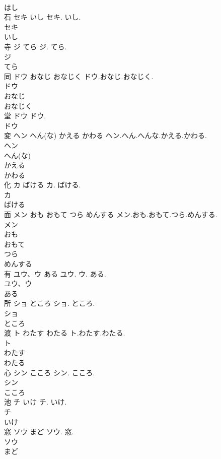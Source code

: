 \documentclass[8pt]{extreport}
\begin{document}
\begin{CJK}{UTF8}{min}
\\	はし
\\	石	セキ いし	セキ. いし.	
\\	セキ
\\	いし
\\	寺	ジ てら	ジ. てら.	
\\	ジ
\\	てら
\\	同	ドウ おなじ おなじく	ドウ.おなじ.おなじく.	
\\	ドウ
\\	おなじ
\\	おなじく
\\	堂	ドウ	ドウ.	
\\	ドウ
\\	変	ヘン へん(な) かえる かわる	ヘン.へん.へんな.かえる.かわる.	
\\	ヘン
\\	へん(な)
\\	かえる
\\	かわる
\\	化	カ ばける	カ. ばける.	
\\	カ
\\	ばける
\\	面	メン おも おもて つら めんする	メン.おも.おもて.つら.めんする.	
\\	メン
\\	おも
\\	おもて
\\	つら
\\	めんする
\\	有	ユウ、ウ ある	ユウ. ウ. ある.	
\\	ユウ、ウ
\\	ある
\\	所	ショ ところ	ショ. ところ.	
\\	ショ
\\	ところ
\\	渡	ト わたす わたる	ト.わたす.わたる.	
\\	ト
\\	わたす
\\	わたる
\\	心	シン こころ	シン. こころ.	
\\	シン
\\	こころ
\\	池	チ いけ	チ. いけ.	
\\	チ
\\	いけ
\\	窓	ソウ まど	ソウ. 窓.	
\\	ソウ
\\	まど

\end{CJK}
\end{document}
